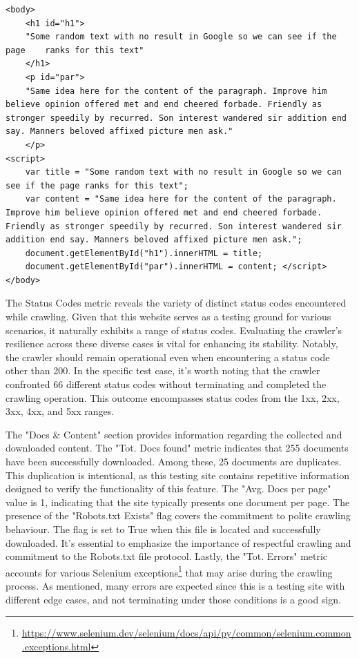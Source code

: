 {\begin{lstlisting}[caption={The dynamically-inserted-text link content after rendering},captionpos=b, label={lst:rendered}]
<body>
	<h1 id="h1">
	"Some random text with no result in Google so we can see if the page 	ranks for this text"
	</h1> 
	<p id="par">
	"Same idea here for the content of the paragraph. Improve him believe opinion offered met and end cheered forbade. Friendly as stronger speedily by recurred. Son interest wandered sir addition end say. Manners beloved affixed picture men ask."
	</p>
<script>
	var title = "Some random text with no result in Google so we can see if the page ranks for this text";
	var content = "Same idea here for the content of the paragraph. Improve him believe opinion offered met and end cheered forbade. Friendly as stronger speedily by recurred. Son interest wandered sir addition end say. Manners beloved affixed picture men ask."; 
	document.getElementById("h1").innerHTML = title; 
	document.getElementById("par").innerHTML = content; </script>
</body>
\end{lstlisting}

The Status Codes metric reveals the variety of distinct status codes encountered while crawling. Given that this website serves as a testing ground for various scenarios, it naturally exhibits a range of status codes. Evaluating the crawler's resilience across these diverse cases is vital for enhancing its stability. Notably, the crawler should remain operational even when encountering a status code other than 200.
In the specific test case, it's worth noting that the crawler confronted 66 different status codes without terminating and completed the crawling operation. This outcome encompasses status codes from the 1xx, 2xx, 3xx, 4xx, and 5xx ranges.

The "Docs & Content" section provides information regarding the collected and downloaded content. The "Tot. Docs found" metric indicates that 255 documents have been successfully downloaded. Among these, 25 documents are duplicates. This duplication is intentional, as this testing site contains repetitive information designed to verify the functionality of this feature.
The "Avg. Docs per page" value is 1, indicating that the site typically presents one document per page. The presence of the "Robots.txt Exists" flag covers the commitment to polite crawling behaviour. The flag is set to True when this file is located and successfully downloaded. It's essential to emphasize the importance of respectful crawling and commitment to the Robots.txt file protocol.
Lastly, the "Tot. Errors" metric accounts for various Selenium exceptions\footnote{\url{https://www.selenium.dev/selenium/docs/api/py/common/selenium.common.exceptions.html}} that may arise during the crawling process. As mentioned, many errors are expected since this is a testing site with different edge cases, and not terminating under those conditions is a good sign.


}
